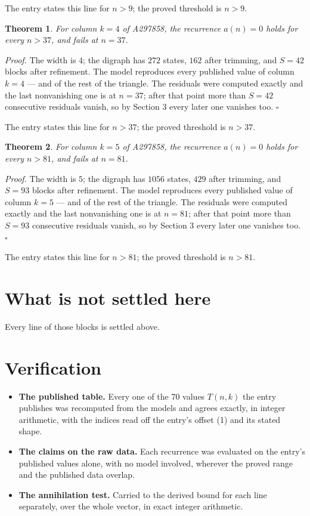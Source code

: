\documentclass[11pt]{article}
\newtheorem{theorem}{Theorem}
\theoremstyle{definition}
\begin{document}
The entry states this line for $n > 9$; the proved threshold is $n > 9$.

\begin{theorem} For column $k = 4$ of A297858, the recurrence $a(n) = 0$ holds for every $n > 37$, and fails at $n = 37$.\end{theorem}

{\itshape Proof.} The width is $4$; the digraph has $272$ states, $162$ after trimming, and $S = 42$ blocks after refinement. The model reproduces every published value of column $k = 4$ --- and of the rest of the triangle. The residuals were computed exactly and the last nonvanishing one is at $n = 37$; after that point more than $S = 42$ consecutive residuals vanish, so by Section 3 every later one vanishes too. $\square$

The entry states this line for $n > 37$; the proved threshold is $n > 37$.

\begin{theorem} For column $k = 5$ of A297858, the recurrence $a(n) = 0$ holds for every $n > 81$, and fails at $n = 81$.\end{theorem}

{\itshape Proof.} The width is $5$; the digraph has $1056$ states, $429$ after trimming, and $S = 93$ blocks after refinement. The model reproduces every published value of column $k = 5$ --- and of the rest of the triangle. The residuals were computed exactly and the last nonvanishing one is at $n = 81$; after that point more than $S = 93$ consecutive residuals vanish, so by Section 3 every later one vanishes too. $\square$

The entry states this line for $n > 81$; the proved threshold is $n > 81$.

\section{What is not settled here}

Every line of those blocks is settled above.

\section{Verification}

\begin{itemize}

\item {\bfseries The published table.} Every one of the 70 values $T(n,k)$ the entry publishes was recomputed from the models and agrees exactly, in integer arithmetic, with the indices read off the entry's offset (1) and its stated shape.

\item {\bfseries The claims on the raw data.} Each recurrence was evaluated on the entry's published values alone, with no model involved, wherever the proved range and the published data overlap.

\item {\bfseries The annihilation test.} Carried to the derived bound for each line separately, over the whole vector, in exact integer arithmetic.

\end{itemize}
\end{document}
